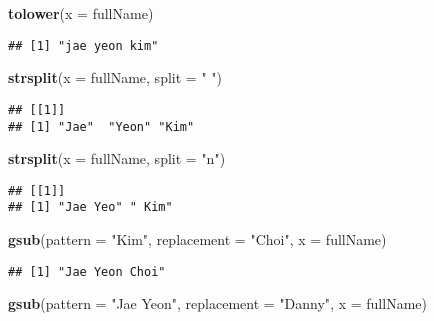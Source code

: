\documentclass[
]{book}
\newenvironment{Shaded}{\begin{snugshade}}{\end{snugshade}}
\newcommand{\DataTypeTok}[1]{\textcolor[rgb]{0.13,0.29,0.53}{#1}}
\newcommand{\KeywordTok}[1]{\textcolor[rgb]{0.13,0.29,0.53}{\textbf{#1}}}
\newcommand{\NormalTok}[1]{#1}
\newcommand{\StringTok}[1]{\textcolor[rgb]{0.31,0.60,0.02}{#1}}
\begin{document}
\begin{Shaded}
\begin{Highlighting}[]
\KeywordTok{tolower}\NormalTok{(}\DataTypeTok{x =}\NormalTok{ fullName)}
\end{Highlighting}
\end{Shaded}

\begin{verbatim}
## [1] "jae yeon kim"
\end{verbatim}

\begin{Shaded}
\begin{Highlighting}[]
\KeywordTok{strsplit}\NormalTok{(}\DataTypeTok{x =}\NormalTok{ fullName, }\DataTypeTok{split =} \StringTok{" "}\NormalTok{)}
\end{Highlighting}
\end{Shaded}

\begin{verbatim}
## [[1]]
## [1] "Jae"  "Yeon" "Kim"
\end{verbatim}

\begin{Shaded}
\begin{Highlighting}[]
\KeywordTok{strsplit}\NormalTok{(}\DataTypeTok{x =}\NormalTok{ fullName, }\DataTypeTok{split =} \StringTok{"n"}\NormalTok{)}
\end{Highlighting}
\end{Shaded}

\begin{verbatim}
## [[1]]
## [1] "Jae Yeo" " Kim"
\end{verbatim}

\begin{Shaded}
\begin{Highlighting}[]
\KeywordTok{gsub}\NormalTok{(}\DataTypeTok{pattern =} \StringTok{"Kim"}\NormalTok{, }\DataTypeTok{replacement =} \StringTok{"Choi"}\NormalTok{, }\DataTypeTok{x =}\NormalTok{ fullName)}
\end{Highlighting}
\end{Shaded}

\begin{verbatim}
## [1] "Jae Yeon Choi"
\end{verbatim}

\begin{Shaded}
\begin{Highlighting}[]
\KeywordTok{gsub}\NormalTok{(}\DataTypeTok{pattern =} \StringTok{"Jae Yeon"}\NormalTok{, }\DataTypeTok{replacement =} \StringTok{"Danny"}\NormalTok{, }\DataTypeTok{x =}\NormalTok{ fullName)}
\end{Highlighting}
\end{Shaded}
\end{document}
